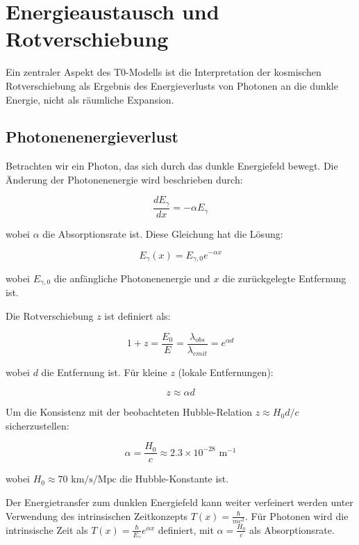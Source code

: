 \documentclass[a4paper,12pt]{article}
\theoremstyle{definition}
\theoremstyle{remark}
\newcommand{\Tfield}{T(x)}
\begin{document}
	\section{Energieaustausch und Rotverschiebung}
	Ein zentraler Aspekt des T0-Modells ist die Interpretation der kosmischen Rotverschiebung als Ergebnis des Energieverlusts von Photonen an die dunkle Energie, nicht als räumliche Expansion.
	
	\subsection{Photonenenergieverlust}
	Betrachten wir ein Photon, das sich durch das dunkle Energiefeld bewegt. Die Änderung der Photonenenergie wird beschrieben durch:
	
	\begin{equation}
		\frac{dE_{\gamma}}{dx} = -\alpha E_{\gamma}
	\end{equation}
	
	wobei $\alpha$ die Absorptionsrate ist. Diese Gleichung hat die Lösung:
	
	\begin{equation}
		E_{\gamma}(x) = E_{\gamma,0} e^{-\alpha x}
	\end{equation}
	
	wobei $E_{\gamma,0}$ die anfängliche Photonenenergie und $x$ die zurückgelegte Entfernung ist.
	
	Die Rotverschiebung $z$ ist definiert als:
	
	\begin{equation}
		1 + z = \frac{E_0}{E} = \frac{\lambda_{obs}}{\lambda_{emit}} = e^{\alpha d}
	\end{equation}
	
	wobei $d$ die Entfernung ist. Für kleine $z$ (lokale Entfernungen):
	
	\begin{equation}
		z \approx \alpha d
	\end{equation}
	
	Um die Konsistenz mit der beobachteten Hubble-Relation $z \approx H_0 d/c$ sicherzustellen:
	
	\begin{equation}
		\alpha = \frac{H_0}{c} \approx 2.3 \times 10^{-28} \text{ m}^{-1}
	\end{equation}
	
	wobei $H_0 \approx 70 \text{ km/s/Mpc}$ die Hubble-Konstante ist.
	
	Der Energietransfer zum dunklen Energiefeld kann weiter verfeinert werden unter Verwendung des intrinsischen Zeitkonzepts $\Tfield = \frac{\hbar}{mc^2}$. Für Photonen wird die intrinsische Zeit als $\Tfield = \frac{\hbar}{E_{\gamma}} e^{\alpha x}$ definiert, mit $\alpha = \frac{H_0}{c}$ als Absorptionsrate.
	
\end{document}
